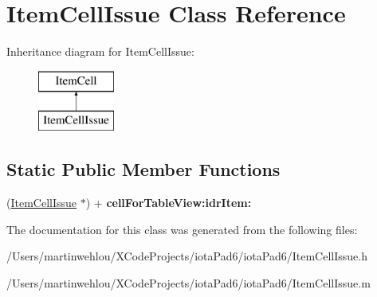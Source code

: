 \hypertarget{interface_item_cell_issue}{
\section{ItemCellIssue Class Reference}
\label{interface_item_cell_issue}
}
Inheritance diagram for ItemCellIssue:\begin{figure}[H]
\begin{center}
\leavevmode
\includegraphics[height=2.000000cm]{interface_item_cell_issue}
\end{center}
\end{figure}
\subsection*{Static Public Member Functions}
\begin{DoxyCompactItemize}
\item 
\hypertarget{interface_item_cell_issue_ac47f3c8add93b7fbe07c400f2258f479}{
(\hyperlink{interface_item_cell_issue}{ItemCellIssue} $\ast$) + {\bfseries cellForTableView:idrItem:}}
\label{interface_item_cell_issue_ac47f3c8add93b7fbe07c400f2258f479}

\end{DoxyCompactItemize}


The documentation for this class was generated from the following files:\begin{DoxyCompactItemize}
\item 
/Users/martinwehlou/XCodeProjects/iotaPad6/iotaPad6/ItemCellIssue.h\item 
/Users/martinwehlou/XCodeProjects/iotaPad6/iotaPad6/ItemCellIssue.m\end{DoxyCompactItemize}
